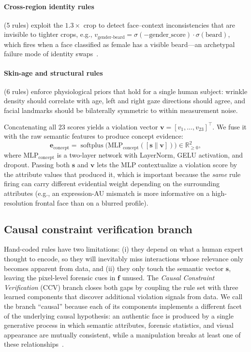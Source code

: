 \documentclass{article}
\begin{document}
\paragraph{Cross-region identity rules} (5 rules) exploit the $1.3{\times}$ crop to detect face--context inconsistencies that are invisible to tighter crops, e.g., $v_\text{gender-beard} = \sigma(-\text{gender\_score}) \cdot \sigma(\text{beard})$, which fires when a face classified as female has a visible beard---an archetypal failure mode of identity swaps~\citep{zhao2021multi}.

\paragraph{Skin-age and structural rules} (6 rules) enforce physiological priors that hold for a single human subject: wrinkle density should correlate with age, left and right gaze directions should agree, and facial landmarks should be bilaterally symmetric to within measurement noise.

Concatenating all 23 scores yields a violation vector $\bm{v} = [v_1, \ldots, v_{23}]^\top$. We fuse it with the raw semantic features to produce concept evidence:
\begin{equation}
  \bm{e}_\text{concept} = \operatorname{softplus}\bigl(\text{MLP}_\text{concept}([\bm{s} \| \bm{v}])\bigr) \in \mathbb{R}^{2}_{\geq 0},
  \label{eq:concept_evidence}
\end{equation}
where $\text{MLP}_\text{concept}$ is a two-layer network with LayerNorm, GELU activation, and dropout. Passing both $\bm{s}$ and $\bm{v}$ lets the MLP contextualize a violation score by the attribute values that produced it, which is important because the \emph{same} rule firing can carry different evidential weight depending on the surrounding attributes (e.g., an expression-AU mismatch is more informative on a high-resolution frontal face than on a blurred profile).


\subsection{Causal constraint verification branch}
\label{sec:ccv}

Hand-coded rules have two limitations: (i) they depend on what a human expert thought to encode, so they will inevitably miss interactions whose relevance only becomes apparent from data, and (ii) they only touch the semantic vector $\bm{s}$, leaving the pixel-level forensic cues in $\bm{f}$ unused. The \emph{Causal Constraint Verification} (CCV) branch closes both gaps by coupling the rule set with three learned components that discover additional violation signals from data. We call the branch ``causal'' because each of its components implements a different facet of the underlying causal hypothesis: an authentic face is produced by a single generative process in which semantic attributes, forensic statistics, and visual appearance are mutually consistent, while a manipulation breaks at least one of these relationships~\citep{scholkopf2021toward}.
\end{document}
